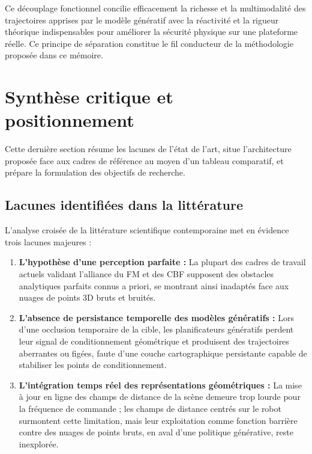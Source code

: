 Ce découplage fonctionnel concilie efficacement la richesse et la multimodalité des trajectoires apprises par le modèle génératif avec la réactivité et la rigueur théorique indispensables pour améliorer la sécurité physique sur une plateforme réelle. Ce principe de séparation constitue le fil conducteur de la méthodologie proposée dans ce mémoire.

\section{Synthèse critique et positionnement}

Cette dernière section résume les lacunes de l'état de l'art, situe l'architecture proposée face aux cadres de référence au moyen d'un tableau comparatif, et prépare la formulation des objectifs de recherche.

\subsection{Lacunes identifiées dans la littérature}
L'analyse croisée de la littérature scientifique contemporaine met en évidence trois lacunes majeures :
\begin{enumerate}
    \item \textbf{L'hypothèse d'une perception parfaite :} La plupart des cadres de travail actuels validant l'alliance du \ac{FM} et des \ac{CBF} supposent des obstacles analytiques parfaits connus a priori, se montrant ainsi inadaptés face aux nuages de points 3D bruts et bruités.
    \item \textbf{L'absence de persistance temporelle des modèles génératifs :} Lors d'une occlusion temporaire de la cible, les planificateurs génératifs perdent leur signal de conditionnement géométrique et produisent des trajectoires aberrantes ou figées, faute d'une couche cartographique persistante capable de stabiliser les points de conditionnement.
    \item \textbf{L'intégration temps réel des représentations géométriques :} La mise à jour en ligne des champs de distance de la scène demeure trop lourde pour la fréquence de commande ; les champs de distance centrés sur le robot surmontent cette limitation, mais leur exploitation comme fonction barrière contre des nuages de points bruts, en aval d'une politique générative, reste inexplorée.
\end{enumerate}

